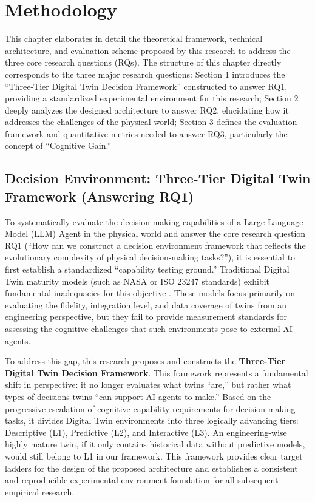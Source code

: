 
\chapter{Methodology} \label{chp:methodology}

This chapter elaborates in detail the theoretical framework, technical architecture, and evaluation scheme proposed by this research to address the three core research questions (RQs). The structure of this chapter directly corresponds to the three major research questions: Section 1 introduces the ``Three-Tier Digital Twin Decision Framework'' constructed to answer RQ1, providing a standardized experimental environment for this research; Section 2 deeply analyzes the designed architecture to answer RQ2, elucidating how it addresses the challenges of the physical world; Section 3 defines the evaluation framework and quantitative metrics needed to answer RQ3, particularly the concept of ``Cognitive Gain.''

\section{Decision Environment: Three-Tier Digital Twin Framework (Answering RQ1)}

To systematically evaluate the decision-making capabilities of a Large Language Model (LLM) Agent in the physical world and answer the core research question RQ1 (``How can we construct a decision environment framework that reflects the evolutionary complexity of physical decision-making tasks?''), it is essential to first establish a standardized ``capability testing ground.'' Traditional Digital Twin maturity models (such as NASA or ISO 23247 standards) exhibit fundamental inadequacies for this objective \cite{glaessgen2012digital, iso23247}. These models focus primarily on evaluating the fidelity, integration level, and data coverage of twins from an engineering perspective, but they fail to provide measurement standards for assessing the cognitive challenges that such environments pose to external AI agents.

To address this gap, this research proposes and constructs the \textbf{Three-Tier Digital Twin Decision Framework}. This framework represents a fundamental shift in perspective: it no longer evaluates what twins ``are,'' but rather what types of decisions twins ``can support AI agents to make.'' Based on the progressive escalation of cognitive capability requirements for decision-making tasks, it divides Digital Twin environments into three logically advancing tiers: Descriptive (L1), Predictive (L2), and Interactive (L3). An engineering-wise highly mature twin, if it only contains historical data without predictive models, would still belong to L1 in our framework. This framework provides clear target ladders for the design of the proposed architecture and establishes a consistent and reproducible experimental environment foundation for all subsequent empirical research.

